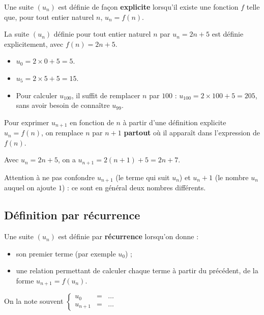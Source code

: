 \documentclass[10pt,a4paper]{article}
\begin{document}
\begin{defi}
    Une suite \((u_n)\) est définie de façon \textbf{explicite} lorsqu'il existe une fonction \(f\) telle que, pour tout entier naturel \(n\), \(u_n = f(n)\).
\end{defi}

\begin{exple}
    La suite \((u_n)\) définie pour tout entier naturel \(n\) par \(u_n = 2n+5\) est définie explicitement, avec \(f(n)=2n+5\).
    \begin{itemize}
        \item \(u_0 = 2\times 0+5 = 5\).
        \item \(u_5 = 2\times 5+5 = 15\).
        \item Pour calculer \(u_{100}\), il suffit de remplacer \(n\) par \(100\) : \(u_{100} = 2\times 100+5 = 205\), sans avoir besoin de connaître \(u_{99}\).
    \end{itemize}
\end{exple}

\begin{met}
    Pour exprimer \(u_{n+1}\) en fonction de \(n\) à partir d'une définition explicite \(u_n=f(n)\), on remplace \(n\) par \(n+1\) \textbf{partout} où il apparaît dans l'expression de \(f(n)\).
\end{met}

\begin{exple}
    Avec \(u_n = 2n+5\), on a \(u_{n+1} = 2(n+1)+5 = 2n+7\).
\end{exple}

\begin{rem}
    Attention à ne pas confondre \(u_{n+1}\) (le terme qui suit \(u_n\)) et \(u_n+1\) (le nombre \(u_n\) auquel on ajoute \(1\)) : ce sont en général deux nombres différents.
\end{rem}

\subsection{Définition par récurrence}

\begin{defi}
    Une suite \((u_n)\) est définie par \textbf{récurrence} lorsqu'on donne :
    \begin{itemize}
        \item son premier terme (par exemple \(u_0\)) ;
        \item une relation permettant de calculer chaque terme à partir du précédent, de la forme \(u_{n+1} = f(u_n)\).
    \end{itemize}
    On la note souvent \(\left\{\begin{array}{rcl} u_0 &=& \ldots \\ u_{n+1} &=& \ldots \end{array}\right.\)
\end{defi}
\end{document}
